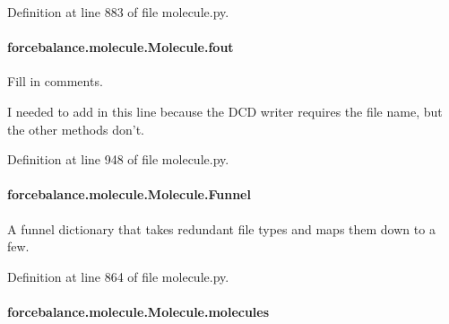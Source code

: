 Definition at line 883 of file molecule.\-py.

\hypertarget{classforcebalance_1_1molecule_1_1Molecule_a2124792d405b58526af41475e4af3c80}{
\paragraph[{fout}]{\setlength{\rightskip}{0pt plus 5cm}forcebalance.\-molecule.\-Molecule.\-fout}}\label{classforcebalance_1_1molecule_1_1Molecule_a2124792d405b58526af41475e4af3c80}


Fill in comments. 

I needed to add in this line because the D\-C\-D writer requires the file name, but the other methods don't. 

Definition at line 948 of file molecule.\-py.

\hypertarget{classforcebalance_1_1molecule_1_1Molecule_a491b10f21e93f841a770088402a13924}{
\paragraph[{Funnel}]{\setlength{\rightskip}{0pt plus 5cm}forcebalance.\-molecule.\-Molecule.\-Funnel}}\label{classforcebalance_1_1molecule_1_1Molecule_a491b10f21e93f841a770088402a13924}


A funnel dictionary that takes redundant file types and maps them down to a few. 



Definition at line 864 of file molecule.\-py.

\hypertarget{classforcebalance_1_1molecule_1_1Molecule_a2537929702245aab6ab293c145730d7c}{
\paragraph[{molecules}]{\setlength{\rightskip}{0pt plus 5cm}forcebalance.\-molecule.\-Molecule.\-molecules}}\label{classforcebalance_1_1molecule_1_1Molecule_a2537929702245aab6ab293c145730d7c}


